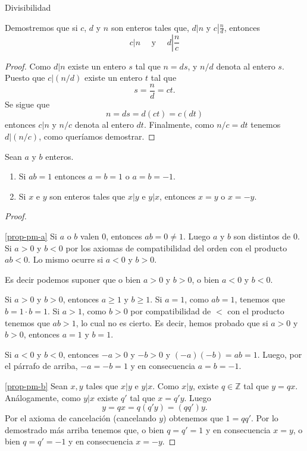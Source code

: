 \begin{section}{Divisibilidad}
\begin{ejemplo*} Demostremos que si $c$, $d$ y $n$ son enteros tales
que, $d|n$ y $c\left|\frac{n}{d}\right.$, entonces
$$ c|n \quad\text{ y }\quad d\left|\frac{n}{c}\right.$$
\end{ejemplo*}
\begin{proof} Como $d|n$ existe un entero $s$ tal que $n=ds$, y
$n/d$ denota al entero $s$. Puesto que $c|(n/d)$ existe un entero
$t$ tal que
$$s=\frac{n}{d} =ct.
$$
Se sigue que
$$
n=ds=d(ct)=c(dt)$$
 entonces $c|n$ y $n/c$ denota al entero $dt$. Finalmente, como
$n/c=dt$ tenemos $d|(n/c)$, como queríamos demostrar.
\end{proof}

\begin{proposicion}\label{pm} Sean $a$ y $b$ enteros.
\begin{enumerate}[label=\textit{\alph*)}]
\item \label{prop-pm-a} Si  $ab=1$ entonces $a=b=1$ o $a=b=-1$. 
\item \label{prop-pm-b}Si $x$ e $y$ son enteros tales que $x|y$ e $y|x$, entonces $x=y$ o $x=-y$.
\end{enumerate}
\end{proposicion}
\begin{proof}
\

\noindent \ref{prop-pm-a} Si $a$ o $b$ valen $0$, entonces $ab=0 \not=1$. Luego $a$ y $b$ son distintos de $0$. Si $a>0$ y $b<0$ por los axiomas de compatibilidad del orden con el producto $ab<0$. Lo mismo ocurre si $a<0$ y $b>0$.

Es decir podemos suponer que o bien $a>0$ y $b>0$, o bien $a<0$ y $b<0$. 

Si  $a>0$ y $b>0$, entonces  $a\ge 1$ y $b\ge 1$. Si $a=1$, como $ab =1$, tenemos que $b = 1 \cdot b = 1$. Si $a>1$, como  $b>0$ por compatibilidad de $<$ con el producto tenemos que $ab>1$, lo cual no es cierto. Es decir, hemos probado que si  $a>0$ y $b>0$, entonces $a=1$ y $b=1$.

Si  $a<0$ y $b<0$, entonces   $-a>0$ y $-b>0$ y $(-a)(-b) = ab =1$. Luego, por el párrafo de arriba, $-a=-b=1$ y en consecuencia $a=b=-1$.

\vskip 0.1cm

\noindent \ref{prop-pm-b} Sean $x,y$ tales que  $x|y$ e $y|x$. Como $x|y$, existe $q \in \mathbb Z$ tal que $y = qx$. Análogamente, como $y|x$ existe $q'$ tal que $x = q'y$. Luego
$$y = qx = q(q'y) = (qq')y.$$
Por el axioma de cancelación (cancelando $y$) obtenemos que $1 = qq'$. Por lo demostrado más arriba tenemos que, o bien $q=q'=1$ y en consecuencia $x=y$, o bien $q=q'=-1$ y en consecuencia $x=-y$. 
\end{proof}


\end{section}
